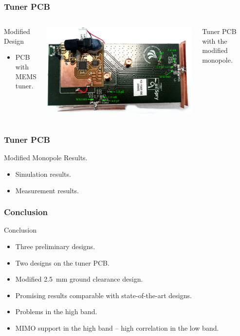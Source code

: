 \begin{frame}[fragile]
    \frametitle{Tuner PCB}
    \begin{columns}[onlytextwidth,t]
        \begin{block}{Modified Design}
          \begin{itemize}
          \item PCB with MEMS tuner.
          \end{itemize}
        \end{block}
        \begin{center}
            \includegraphics[scale=0.33]{img/Lasse/lassedouble.pdf}
        \end{center}
        Tuner PCB with the modified monopole.
    \end{columns}
\end{frame}

\begin{frame}
  \frametitle{Tuner PCB}
    \begin{block}{Modified Monopole Results.}
      \begin{itemize}
      \item Simulation results.
      \item Measurement results.
      \end{itemize}
    \end{block}
\end{frame}

\begin{frame}
  \frametitle{Conclusion}
    \begin{block}{Conclusion}
      \begin{itemize}
      \item Three preliminary designs.
      \item Two designs on the tuner PCB.
      \item Modified \SI{2.5}{mm} ground clearance design.
    \item Promising results comparable with state-of-the-art designs.
    \item Problems in the high band.
    \item MIMO support in the high band -- high correlation in the low band.
      \end{itemize}
    \end{block}
\end{frame}

